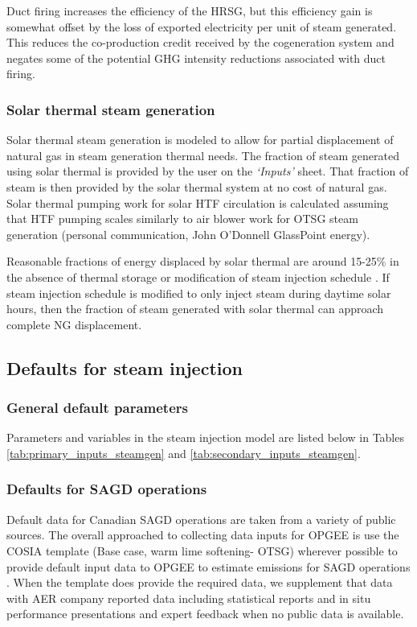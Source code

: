 \documentclass[11pt]{report}
\newcommand{\sheet}[1]{\textit{`{#1}'}}
\begin{document}
Duct firing increases the efficiency of the HRSG, but this efficiency gain is somewhat offset by the loss of exported electricity per unit of steam generated. This reduces the co-production credit received by the cogeneration system and negates some of the potential GHG intensity reductions associated with duct firing.


\subsubsection{Solar thermal steam generation}
\label{solarthermal}

  Solar thermal steam generation is modeled to allow for partial displacement of natural gas in steam generation thermal needs.  The fraction of steam generated using solar thermal is provided by the user on the \sheet{Inputs} sheet.  That fraction of steam is then provided by the solar thermal system at no cost of natural gas. Solar thermal pumping work for solar HTF circulation is calculated assuming that HTF pumping scales similarly to air blower work for OTSG steam generation (personal communication, John O'Donnell GlassPoint energy).

Reasonable fractions of energy displaced by solar thermal are around 15-25\% in the absence of thermal storage or modification of steam injection schedule \cite{Wang2016, Sandler2014, Palmer2015}. If steam injection schedule is modified to only inject steam during daytime solar hours, then the fraction of steam generated with solar thermal can approach complete NG displacement.

\subsection{Defaults for steam injection}

\subsubsection{General default parameters}

Parameters and variables in the steam injection model are listed below in Tables \ref{tab:primary_inputs_steamgen} and \ref{tab:secondary_inputs_steamgen}.


\subsubsection{Defaults for SAGD operations}

Default data for Canadian SAGD operations are taken from a variety of public sources.  The overall approached to collecting data inputs for OPGEE is use the COSIA template (Base case, warm lime softening- OTSG) \cite{COSIA2014} wherever possible to provide default input data to OPGEE to estimate emissions for SAGD operations \cite{COSIA2014}. When the template does provide the required data, we supplement that data with AER company reported data including statistical reports \cite{AERvar} and in situ performance presentations \cite{AERvarISPP} and expert feedback when no public data is available.
\end{document}
